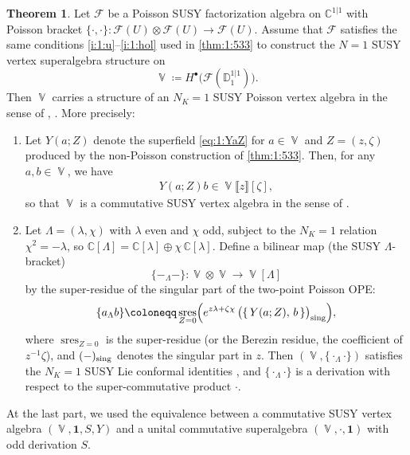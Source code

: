 \documentclass[final,reqno]{amsart}
\numberwithin{equation}{section}
\theoremstyle{definition}
\newtheorem{thm}{Theorem}[section]
\newcommand{\bl}{\bullet}
\newcommand{\ceq}{\coloneqq} %
\newcommand{\lto}{\longrightarrow}
\newcommand{\sing}{\textup{sing}}
\newcommand{\bbC}{\mathbb{C}}
\newcommand{\sC}{\mathbb{C}^{1|1}}
\newcommand{\sD}{\mathbb{D}^{1|1}}
\newcommand{\clF}{\mathcal{F}}
\newcommand{\dbr}[1]{\llbracket #1 \rrbracket} %
\DeclareMathOperator{\bbV}{\mathbb{V}}
\DeclareMathOperator*{\sres}{sres}
\begin{document}
\begin{thm}\label{thm:1:SPVA}
Let $\clF$ be a Poisson SUSY factorization algebra on $\sC$ 
with Poisson bracket 
$\{\cdot,\cdot\}\colon \clF(U) \otimes \clF(U)\to \clF(U)$.
Assume that $\clF$ satisfies the same conditions \ref{i:1:u}--\ref{i:1:hol}
used in \cref{thm:1:533} to construct 
the $N=1$ SUSY vertex superalgebra structure on
\[
 \bbV \ceq H^{\bl}\!\bigl(\clF(\sD_1)\bigr).
\]
Then $\bbV$ carries a structure of an $N_K=1$ SUSY Poisson vertex algebra
in the sense of \cite[\S4.10]{HK}, \cite[\S3.1.4]{Y}.
More precisely: 
\begin{enumerate}
\item
Let $Y(a;Z)$ denote the superfield \eqref{eq:1:YaZ} for $a\in\bbV$ 
and $Z=(z,\zeta)$ produced by the non-Poisson construction of \cref{thm:1:533}.
Then, for any $a,b\in\bbV$, we have
\begin{align}\label{eq:1:Yser}
 Y(a;Z)b \in \bbV\dbr{z}[\zeta],
\end{align}
so that $\bbV$ is a commutative SUSY vertex algebra 
in the sense of \cite[\S2.4.1]{Y}.

\item 
Let $\Lambda=(\lambda,\chi)$ with $\lambda$ even and $\chi$ odd, 
subject to the $N_K=1$ relation $\chi^2=-\lambda$, 
so $\bbC[\Lambda]=\bbC[\lambda]\oplus\chi\,\bbC[\lambda]$. 
Define a bilinear map (the SUSY $\Lambda$-bracket)
\[
 \{-_\Lambda-\}\colon \bbV \otimes \bbV \lto \bbV[\Lambda]
\]
by the super-residue of the singular part of the two-point Poisson OPE:
\begin{align}\label{eq:1:P}
 \{a_\Lambda b\} \ceq
 \sres_{Z=0} \Bigl(e^{z\lambda+\zeta\chi}\,
 \bigl(\{\,Y(a;Z),\,b\,\}\bigr)_{\sing}\Bigr),
\end{align}
where $\sres_{Z=0}$ is the super-residue
(or the Berezin residue, the coefficient of $z^{-1}\zeta$), 
and $(-)_{\sing}$ denotes the singular part in $z$.
Then $(\bbV,\{\cdot_\Lambda \cdot\})$ satisfies 
the $N_K=1$ SUSY Lie conformal identities \cite[Definition 4.10]{HK}, 
and $\{\cdot_\Lambda \cdot\}$ is a derivation with respect to 
the super-commutative product $\cdot$. 
\end{enumerate}
\end{thm}

At the last part, we used the equivalence \cite[\S3.1.4]{Y} 
between a commutative SUSY vertex algebra $(\bbV,\bm{1},S,Y)$ 
and a unital commutative superalgebra $(\bbV,\cdot,\bm{1})$ 
with odd derivation $S$.
\end{document}
